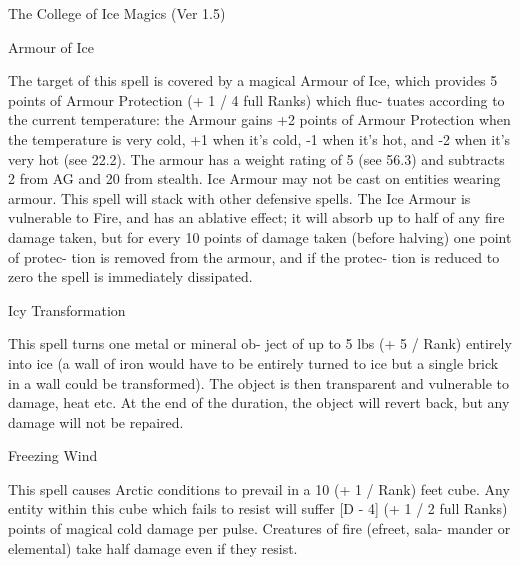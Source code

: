 \begin{Chapter}{The College of Ice Magics (Ver 1.5)}
\begin{spell}[S-1]{Armour of Ice }
\begin{effects}
 The  target  of  this  spell  is  covered  by  a 
magical Armour of Ice, which provides 5 points of 
Armour Protection (+ 1 / 4 full Ranks) which fluc-
tuates  according  to  the  current  temperature:  the 
Armour  gains  +2  points  of  Armour  Protection 
when  the  temperature  is  very  cold,  +1  when  it’s 
cold,  -1  when  it’s  hot,  and  -2  when  it’s  very  hot 
(see 22.2). The armour has a weight rating of 5 (see 
56.3) and subtracts 2 from AG and 20 from stealth. 
Ice  Armour  may  not  be  cast  on  entities  wearing 
armour.  This  spell  will  stack  with  other  defensive 
spells.  The  Ice  Armour  is  vulnerable  to  Fire,  and 
has  an  ablative  effect;  it  will  absorb  up  to  half  of 
any  fire  damage  taken,  but  for  every  10  points  of 
damage taken (before halving) one point of protec-
tion is removed from the armour, and if the protec-
tion  is  reduced  to  zero  the  spell  is  immediately 
dissipated. 

\end{effects}
\end{spell}

\begin{spell}[S-2]{Icy Transformation }

\begin{effects}
 This  spell  turns  one  metal  or  mineral  ob-
ject of up to 5 lbs (+ 5 / Rank) entirely into ice (a 
wall of iron would have to be entirely turned to ice 
but a single brick in a wall could be transformed). 
The  object  is  then  transparent  and  vulnerable  to 
damage,  heat  etc.  At  the  end  of  the  duration,  the 
object will revert back, but any damage will not be 
repaired. 

\end{effects}
\end{spell}

\begin{spell}[S-3]{Freezing Wind }

\begin{effects}
 This  spell  causes  Arctic  conditions  to 
prevail  in  a  10  (+  1  /  Rank)  feet  cube.  Any  entity 
within this cube which fails to resist will suffer [D 
-  4]  (+  1  /  2  full  Ranks)  points  of  magical  cold 
damage  per  pulse.  Creatures  of  fire  (efreet,  sala-
mander or elemental) take half damage even if they 
resist. 


\end{effects}
\end{spell}
\end{Chapter}
